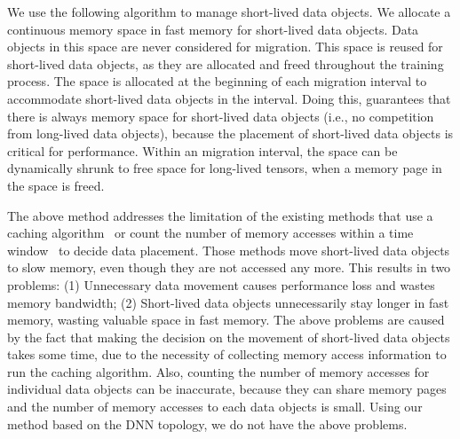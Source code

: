 We use the following algorithm to manage short-lived data objects. We allocate a continuous memory space in fast memory for short-lived data objects. Data objects in this space are never considered for migration. This space is reused for short-lived data objects, as they are allocated and freed \textcolor{check}{throughout the training process}. The space is allocated at the beginning of each migration interval to accommodate short-lived data objects in the interval. Doing this, \name guarantees that there is always memory space for short-lived data objects (i.e., no competition from long-lived data objects), because the placement of short-lived data objects is critical for performance. 
Within an migration interval, the space can be dynamically shrunk to free space for long-lived tensors, when a memory page in the space is freed. %


The above method addresses the limitation of the existing methods that use a caching algorithm~\cite{Ramos:ics11, RAMinate:socc16, 5260554, Yan:ASPLOS19, heteros:isca17} or count the number of memory accesses within a time window~\cite{Thermostat:asplos17, unimem:sc17}  \textcolor{check}{to decide data placement}. Those methods move short-lived data objects to slow memory, even though they are not accessed any more. This results in two problems: (1) Unnecessary data movement causes performance loss and wastes memory bandwidth; (2) Short-lived data objects unnecessarily stay longer in fast memory, wasting valuable space in fast memory. The above problems are caused by the fact that making the decision on the movement of short-lived data objects takes some time, due to the necessity of collecting memory access information to run the caching algorithm. Also, counting the number of memory accesses for individual data objects can be inaccurate, because they can share memory pages and the number of memory accesses to each data objects is small. \textcolor{check}{Using our method based on the DNN topology, we do not have the above problems.} 


